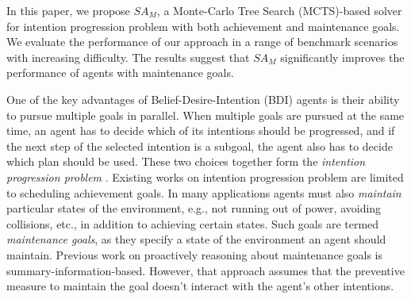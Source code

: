 \documentclass[a0, portrait]{a0poster}
\newcommand{\SAM}{\emph{$SA_M$}\xspace}
\begin{document}
\begin{multicols}{3} %





In this paper, we propose \SAM, a Monte-Carlo Tree Search (MCTS)-based solver for intention progression problem with both achievement and maintenance goals. We evaluate the performance of our approach in a range of benchmark scenarios with increasing difficulty. The results suggest that \SAM significantly improves the performance of agents with maintenance goals.


One of the key advantages of Belief-Desire-Intention (BDI) agents \cite{Rao/Georgeff:92a} is their ability to pursue multiple goals in parallel.
%
When multiple goals are pursued at the same time,  an agent has to decide which of its intentions should be progressed, and if the next step of the selected intention is a subgoal, the agent also has to decide which plan should be used. These two choices together form the \textit{intention progression problem} \cite{Logan//:17a}.
%
Existing works on intention progression problem are limited to scheduling achievement goals. In many applications agents must also \emph{maintain} particular states of the environment, e.g., not running out of power, avoiding collisions, etc., in addition to achieving certain states.
Such goals are termed \textit{maintenance goals}, as they specify a state of the environment an agent should maintain. 
Previous work \cite{DuffHT06} on proactively reasoning about maintenance goals is summary-information-based. However, that approach assumes that the preventive measure to maintain the goal doesn't interact with the agent's other intentions.


\end{multicols}
\end{document}
